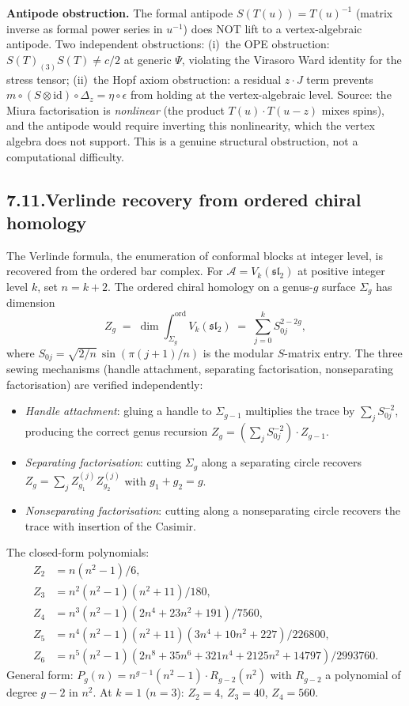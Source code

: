 \documentclass[11pt,reqno]{amsart}
\theoremstyle{definition}
\theoremstyle{remark}
\providecommand{\cA}{\mathcal{A}}
\providecommand{\id}{\mathrm{id}}
\numberwithin{equation}{section}
\begin{document}
\medskip\noindent\textbf{Antipode obstruction.}\enspace
The formal antipode $S(T(u)) = T(u)^{-1}$ (matrix inverse as
formal power series in $u^{-1}$) does NOT lift to a
vertex-algebraic antipode. Two independent obstructions:
(i)~the OPE obstruction:
$S(T)_{(3)}S(T) \neq c/2$ at generic $\Psi$, violating the
Virasoro Ward identity for the stress tensor; (ii)~the Hopf
axiom obstruction: a residual $z \cdot J$ term prevents
$m \circ (S \otimes \id) \circ \Delta_z = \eta \circ \epsilon$
from holding at the vertex-algebraic level. Source: the Miura
factorisation is \emph{nonlinear} (the product $T(u) \cdot T(u-z)$
mixes spins), and the antipode would require
inverting this nonlinearity, which the vertex algebra does not
support. This is a genuine structural obstruction, not a
computational difficulty.

\subsection*{7.11.\quad Verlinde recovery from ordered chiral homology}

The Verlinde formula, the enumeration of conformal blocks at
integer level, is recovered from the ordered bar complex. For
$\cA = V_k(\mathfrak{sl}_2)$ at positive integer level $k$,
set $n = k + 2$. The ordered chiral homology on a genus-$g$
surface $\Sigma_g$ has dimension
\[
Z_g \;=\; \dim \int^{\mathrm{ord}}_{\Sigma_g} V_k(\mathfrak{sl}_2)
\;=\; \sum_{j=0}^{k} S_{0j}^{2-2g},
\]
where $S_{0j} = \sqrt{2/n}\,\sin(\pi(j+1)/n)$ is the modular
$S$-matrix entry. The three sewing mechanisms (handle attachment,
separating factorisation, nonseparating factorisation) are
verified independently:
\begin{itemize}[nosep]
\item \emph{Handle attachment}: gluing a handle to $\Sigma_{g-1}$
multiplies the trace by $\sum_j S_{0j}^{-2}$, producing the
correct genus recursion $Z_g = (\sum_j S_{0j}^{-2}) \cdot Z_{g-1}$.
\item \emph{Separating factorisation}: cutting $\Sigma_g$ along a
separating circle recovers $Z_g = \sum_j Z_{g_1}^{(j)} Z_{g_2}^{(j)}$
with $g_1 + g_2 = g$.
\item \emph{Nonseparating factorisation}: cutting along a
nonseparating circle recovers the trace with insertion of the
Casimir.
\end{itemize}

The closed-form polynomials:
\begin{align*}
Z_2 &= n(n^2 - 1)/6,\\
Z_3 &= n^2(n^2 - 1)(n^2 + 11)/180,\\
Z_4 &= n^3(n^2 - 1)(2n^4 + 23n^2 + 191)/7560,\\
Z_5 &= n^4(n^2 - 1)(n^2 + 11)(3n^4 + 10n^2 + 227)/226800,\\
Z_6 &= n^5(n^2 - 1)(2n^8 + 35n^6 + 321n^4 + 2125n^2 + 14797)/2993760.
\end{align*}
General form: $P_g(n) = n^{g-1}(n^2 - 1) \cdot R_{g-2}(n^2)$
with $R_{g-2}$ a polynomial of degree $g - 2$ in $n^2$. At
$k = 1$ ($n = 3$): $Z_2 = 4$, $Z_3 = 40$, $Z_4 = 560$.
\end{document}
